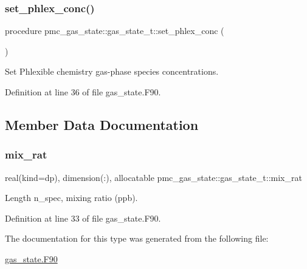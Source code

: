 \mbox{\label{structpmc__gas__state_1_1gas__state__t_a5e0cad2789495f361bd9d62812f36a2a}} 
\subsubsection{\texorpdfstring{set\+\_\+phlex\+\_\+conc()}{set\_phlex\_conc()}}
{\footnotesize\ttfamily procedure pmc\+\_\+gas\+\_\+state\+::gas\+\_\+state\+\_\+t\+::set\+\_\+phlex\+\_\+conc (\begin{DoxyParamCaption}{ }\end{DoxyParamCaption})}



Set Phlexible chemistry gas-\/phase species concentrations. 



Definition at line 36 of file gas\+\_\+state.\+F90.



\subsection{Member Data Documentation}
\mbox{\label{structpmc__gas__state_1_1gas__state__t_a567c8021551389cf37bf215043ef2f90}} 
\subsubsection{\texorpdfstring{mix\+\_\+rat}{mix\_rat}}
{\footnotesize\ttfamily real(kind=dp), dimension(\+:), allocatable pmc\+\_\+gas\+\_\+state\+::gas\+\_\+state\+\_\+t\+::mix\+\_\+rat}



Length n\+\_\+spec, mixing ratio (ppb). 



Definition at line 33 of file gas\+\_\+state.\+F90.



The documentation for this type was generated from the following file\+:\begin{DoxyCompactItemize}
\item 
\mbox{\hyperlink{gas__state_8_f90}{gas\+\_\+state.\+F90}}\end{DoxyCompactItemize}
